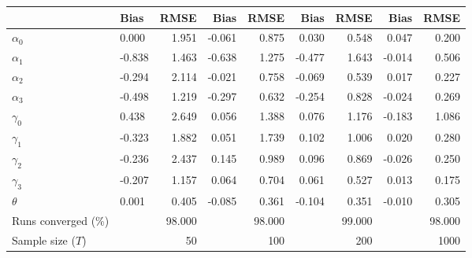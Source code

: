 
\begin{tabular}[t]{llrrrrrrr}
\toprule
  & Bias & RMSE & Bias & RMSE & Bias & RMSE & Bias & RMSE\\
\midrule
$\alpha_{0}$ & 0.000 & 1.951 & -0.061 & 0.875 & 0.030 & 0.548 & 0.047 & 0.200\\
$\alpha_{1}$ & -0.838 & 1.463 & -0.638 & 1.275 & -0.477 & 1.643 & -0.014 & 0.506\\
$\alpha_{2}$ & -0.294 & 2.114 & -0.021 & 0.758 & -0.069 & 0.539 & 0.017 & 0.227\\
$\alpha_{3}$ & -0.498 & 1.219 & -0.297 & 0.632 & -0.254 & 0.828 & -0.024 & 0.269\\
$\gamma_{0}$ & 0.438 & 2.649 & 0.056 & 1.388 & 0.076 & 1.176 & -0.183 & 1.086\\
$\gamma_{1}$ & -0.323 & 1.882 & 0.051 & 1.739 & 0.102 & 1.006 & 0.020 & 0.280\\
$\gamma_{2}$ & -0.236 & 2.437 & 0.145 & 0.989 & 0.096 & 0.869 & -0.026 & 0.250\\
$\gamma_{3}$ & -0.207 & 1.157 & 0.064 & 0.704 & 0.061 & 0.527 & 0.013 & 0.175\\
$\theta$ & 0.001 & 0.405 & -0.085 & 0.361 & -0.104 & 0.351 & -0.010 & 0.305\\
Runs converged (\%) &  & 98.000 &  & 98.000 &  & 99.000 &  & 98.000\\
Sample size ($T$) &  & 50 &  & 100 &  & 200 &  & 1000\\
\bottomrule
\end{tabular}
